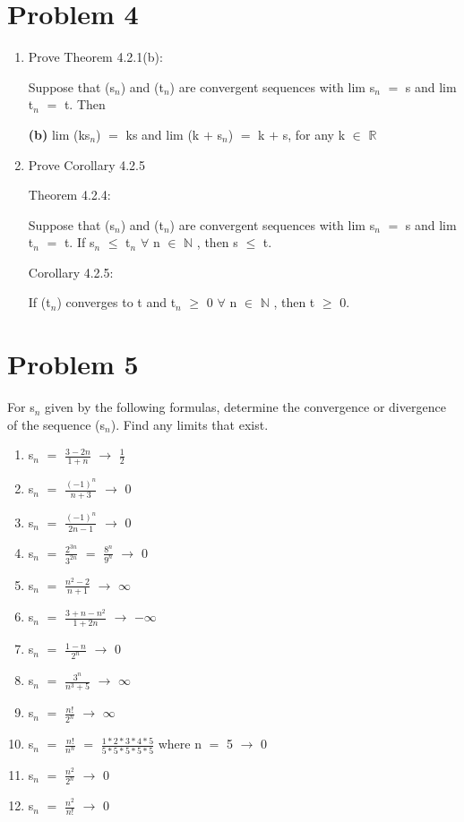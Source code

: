 \documentclass{article}
\newcommand{\mt}[1]{\ensuremath{#1}}
\newcommand\bsc[2][\DefaultOpt]{%
  \def\DefaultOpt{#2}%
  \section[#1]{#2}%
}
\newcommand{\balist}{\begin{enumerate}[label=\alph*.]}
\newcommand{\elist}{\end{enumerate}}
\newcommand{\bpth}[1]{\textbf{(#1)}}
\newcommand{\br}{\mt{\mathbb{R}} }       %
\newcommand{\bn}{\mt{\mathbb{N}} }       %
\newcommand{\fa}{\mt{\forall} }          %
\newcommand{\mem}{\mt{\in} }
\newcommand{\lra}{ \mt{\longrightarrow} } %
\newcommand{\prn}[1]{(#1)}
\newcommand{\ps}{\mt{+} }
\newcommand{\lse}{\mt{\leq} }
\newcommand{\gre}{\mt{\geq} }
\newcommand{\eql}{\mt{=} }
\newcommand{\uw}[2]{#1\mt{_{#2}}}
\newcommand{\frc}[2]{\mt{\frac{#1}{#2}}}
\begin{document}
\bsc{Problem 4}{
\balist
\item Prove Theorem 4.2.1(b):
	
	Suppose that \prn{\uw{s}{n}} and (\uw{t}{n}) are convergent sequences with lim \uw{s}{n} \eql s and lim \uw{t}{n} \eql t. Then
	
	\bpth{b} lim (k\uw{s}{n}) \eql ks and lim (k \ps \uw{s}{n}) \eql k \ps s, for any k \mem \br
	
	
\item Prove Corollary 4.2.5
	
	Theorem 4.2.4:
	
	Suppose that (\uw{s}{n}) and (\uw{t}{n}) are convergent sequences with lim \uw{s}{n} \eql s and lim \uw{t}{n} \eql t. If \uw{s}{n} \lse \uw{t}{n} \fa n \mem \bn, then s \lse t.
	
	Corollary 4.2.5:
	
	If \prn{\uw{t}{n}} converges to t and \uw{t}{n} \gre 0 \fa n \mem \bn, then t \gre 0.
\elist
}

\bsc{Problem 5}{
For \uw{s}{n} given by the following formulas, determine the convergence or divergence of the sequence \prn{\uw{s}{n}}. Find any limits that exist.

\balist
\item \uw{s}{n} \eql \frc{3 - 2n}{1 + n} \lra \frc{1}{2}
\item \uw{s}{n} \eql \frc{(-1)^n}{n + 3} \lra 0
\item \uw{s}{n} \eql \frc{(-1)^n}{2n - 1} \lra 0
\item \uw{s}{n} \eql \frc{2^{3n}}{3^{2n}} \eql \frc{8^n}{9^n} \lra 0
\item \uw{s}{n} \eql \frc{n^2 - 2}{n + 1} \lra $\infty$
\item \uw{s}{n} \eql \frc{3 + n - n^2}{1 + 2n} \lra $-\infty$
\item \uw{s}{n} \eql \frc{1 - n}{2^n	} \lra 0
\item \uw{s}{n} \eql \frc{3^n}{n^3 + 5} \lra $\infty$
\item \uw{s}{n} \eql \frc{n!}{2^n} \lra $\infty$
\item \uw{s}{n} \eql \frc{n!}{n^n} \eql \frc{1 * 2 * 3 * 4 * 5}{5 * 5 * 5 * 5 * 5} where n \eql 5 \lra 0
\item \uw{s}{n} \eql \frc{n^2}{2^n} \lra 0
\item \uw{s}{n} \eql \frc{n^2}{n!} \lra 0
\elist
}
\end{document}
